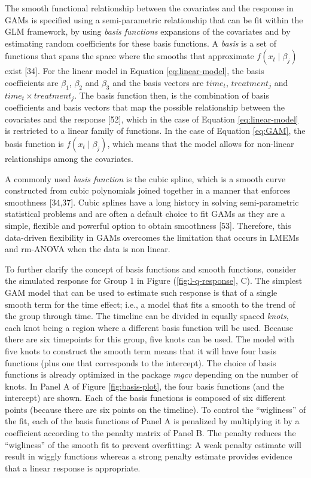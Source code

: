 \documentclass[
]{article}
\begin{document}
The smooth functional relationship between the covariates and the response in GAMs is specified using a semi-parametric relationship that can be fit within the GLM framework, by using \emph{basis functions} expansions of the covariates and by estimating random coefficients for these basis functions. A \emph{basis} is a set of functions that spans the space where the smooths that approximate \(f(x_t \mid \beta_j)\) exist {[}34{]}. For the linear model in Equation \eqref{eq:linear-model}, the basis coefficients are \(\beta_1\), \(\beta_2\) and \(\beta_3\) and the basis vectors are \(time_t\), \(treatment_j\) and \(time_t \times treatment_j\). The basis function then, is the combination of basis coefficients and basis vectors that map the possible relationship between the covariates and the response {[}52{]}, which in the case of Equation \eqref{eq:linear-model} is restricted to a linear family of functions. In the case of Equation \eqref{eq:GAM}, the basis function is \(f(x_t\mid \beta_j)\), which means that the model allows for non-linear relationships among the covariates.

A commonly used \emph{basis function} is the cubic spline, which is a smooth curve constructed from cubic polynomials joined together in a manner that enforces smoothness {[}34,37{]}. Cubic splines have a long history in solving semi-parametric statistical problems and are often a default choice to fit GAMs as they are a simple, flexible and powerful option to obtain smoothness {[}53{]}. Therefore, this data-driven flexibility in GAMs overcomes the limitation that occurs in LMEMs and rm-ANOVA when the data is non linear.

To further clarify the concept of basis functions and smooth functions, consider the simulated response for Group 1 in Figure (\ref{fig:l-q-response}, C). The simplest GAM model that can be used to estimate such response is that of a single smooth term for the time effect; i.e., a model that fits a smooth to the trend of the group through time. The timeline can be divided in equally spaced \emph{knots}, each knot being a region where a different basis function will be used. Because there are six timepoints for this group, five knots can be used. The model with five knots to construct the smooth term means that it will have four basis functions (plus one that corresponds to the intercept). The choice of basis functions is already optimized in the package \emph{mgcv} depending on the number of knots. In Panel A of Figure \ref{fig:basis-plot}, the four basis functions (and the intercept) are shown. Each of the basis functions is composed of six different points (because there are six points on the timeline). To control the ``wigliness'' of the fit, each of the basis functions of Panel A is penalized by multiplying it by a coefficient according to the penalty matrix of Panel B. The penalty reduces the ``wigliness'' of the smooth fit to prevent overfitting: A weak penalty estimate will result in wiggly functions whereas a strong penalty estimate provides evidence that a linear response is appropriate.
\end{document}
